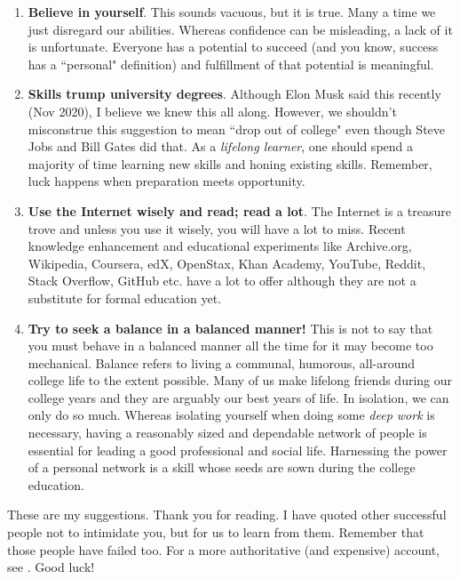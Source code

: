\documentclass[a6paper]{article}
\begin{document}
\begin{enumerate}
    \item \textbf{Believe in yourself}. This sounds vacuous, but it is true. Many a time we just disregard our abilities. Whereas confidence can be misleading, a lack of it is unfortunate. Everyone has a potential to succeed (and you know, success has a ``personal" definition) and fulfillment of that potential is meaningful. 
    \item \textbf{Skills trump university degrees}. Although Elon Musk said this recently (Nov 2020), I believe we knew this all along. However, we shouldn't misconstrue this suggestion to mean ``drop out of college" even though Steve Jobs and Bill Gates did that. As a \emph{lifelong learner}, one should spend a majority of time learning new skills and honing existing skills. Remember, luck happens when preparation meets opportunity.
    \item \textbf{Use the Internet wisely and read; read a lot}. The Internet is a treasure trove and unless you use it wisely, you will have a lot to miss. Recent knowledge enhancement and educational experiments like Archive.org, Wikipedia, Coursera, edX, OpenStax, Khan Academy, YouTube, Reddit, Stack Overflow, GitHub etc. have a lot to offer although they are not a substitute for formal education yet.
    \item \textbf{Try to seek a balance in a balanced manner!} This is not to say that you must behave in a balanced manner all the time for it may become too mechanical. Balance refers to living a communal, humorous, all-around college life to the extent possible. Many of us make lifelong friends during our college years and they are arguably our best years of life. In isolation, we can only do so much. Whereas isolating yourself when doing some \emph{deep work} is necessary, having a reasonably sized and dependable network of people is essential for leading a good professional and social life. Harnessing the power of a personal network is a skill whose seeds are sown during the college education.
\end{enumerate}

These are my suggestions. Thank you for reading. I have quoted other successful people not to intimidate you, but for us to learn from them. Remember that those people have failed too. For a more authoritative (and expensive) account, see \cite{ken-bain}. Good luck!
\end{document}
